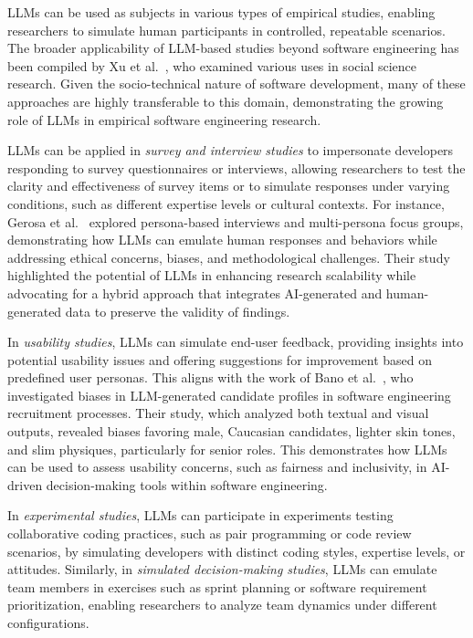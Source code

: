 LLMs can be used as subjects in various types of empirical studies, enabling researchers to simulate human participants in controlled, repeatable scenarios. The broader applicability of LLM-based studies beyond software engineering has been compiled by Xu et al.~\cite{DBLP:journals/ipm/XuSRGPLSH24}, who examined various uses in social science research. Given the socio-technical nature of software development, many of these approaches are highly transferable to this domain, demonstrating the growing role of LLMs in empirical software engineering research.

LLMs can be applied in \textit{survey and interview studies} to impersonate developers responding to survey questionnaires or interviews, allowing researchers to test the clarity and effectiveness of survey items or to simulate responses under varying conditions, such as different expertise levels or cultural contexts. For instance, Gerosa et al.~\cite{DBLP:journals/ase/GerosaTSS24} explored persona-based interviews and multi-persona focus groups, demonstrating how LLMs can emulate human responses and behaviors while addressing ethical concerns, biases, and methodological challenges. Their study highlighted the potential of LLMs in enhancing research scalability while advocating for a hybrid approach that integrates AI-generated and human-generated data to preserve the validity of findings.

In \textit{usability studies}, LLMs can simulate end-user feedback, providing insights into potential usability issues and offering suggestions for improvement based on predefined user personas. This aligns with the work of Bano et al.~\cite{bano2025doessoftwareengineerlook}, who investigated biases in LLM-generated candidate profiles in software engineering recruitment processes. Their study, which analyzed both textual and visual outputs, revealed biases favoring male, Caucasian candidates, lighter skin tones, and slim physiques, particularly for senior roles. This demonstrates how LLMs can be used to assess usability concerns, such as fairness and inclusivity, in AI-driven decision-making tools within software engineering.

In \textit{experimental studies}, LLMs can participate in experiments testing collaborative coding practices, such as pair programming or code review scenarios, by simulating developers with distinct coding styles, expertise levels, or attitudes. 
Similarly, in \textit{simulated decision-making studies}, LLMs can emulate team members in exercises such as sprint planning or software requirement prioritization, enabling researchers to analyze team dynamics under different configurations.

